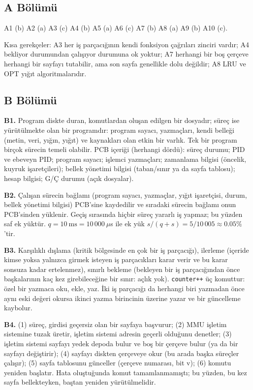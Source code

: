\documentclass[11pt,a4paper]{article}
\begin{document}
\subsection*{A Bölümü}
A1 (b) \quad A2 (a) \quad A3 (c) \quad A4 (b) \quad A5 (a) \quad A6 (c) \quad A7 (b) \quad A8 (a) \quad A9 (b) \quad A10 (c).

Kısa gerekçeler: A3 her iş parçacığının kendi fonksiyon çağrıları zinciri vardır; A4 bekliyor durumundan çalışıyor durumuna ok yoktur; A7 herhangi bir boş çerçeve herhangi bir sayfayı tutabilir, ama son sayfa genellikle dolu değildir; A8 LRU ve OPT yığıt algoritmalarıdır.

\subsection*{B Bölümü}
\textbf{B1.} Program diskte duran, komutlardan oluşan edilgen bir dosyadır; süreç ise yürütülmekte olan bir programdır: program sayacı, yazmaçları, kendi belleği (metin, veri, yığın, yığıt) ve kaynakları olan etkin bir varlık. Tek bir program birçok sürecin temeli olabilir. PCB içeriği (herhangi dördü): süreç durumu; PID ve ebeveyn PID; program sayacı; işlemci yazmaçları; zamanlama bilgisi (öncelik, kuyruk işaretçileri); bellek yönetimi bilgisi (taban/sınır ya da sayfa tablosu); hesap bilgisi; G/Ç durumu (açık dosyalar).

\textbf{B2.} Çalışan sürecin bağlamı (program sayacı, yazmaçlar, yığıt işaretçisi, durum, bellek yönetimi bilgisi) PCB'sine kaydedilir ve sıradaki sürecin bağlamı onun PCB'sinden yüklenir. Geçiş sırasında hiçbir süreç yararlı iş yapmaz; bu yüzden saf ek yüktür. $q = 10\ \text{ms} = 10\,000\ \mu$s ile ek yük $s/(q+s) = 5/10\,005 \approx 0.05\%$'tir.

\textbf{B3.} Karşılıklı dışlama (kritik bölgesinde en çok bir iş parçacığı), ilerleme (içeride kimse yoksa yalnızca girmek isteyen iş parçacıkları karar verir ve bu karar sonsuza kadar ertelenmez), sınırlı bekleme (bekleyen bir iş parçacığından önce başkalarının kaç kez girebileceğine bir sınır: açlık yok). \texttt{counter++} üç komuttur: özel bir yazmaca oku, ekle, yaz. İki iş parçacığı da herhangi biri yazmadan önce aynı eski değeri okursa ikinci yazma birincinin üzerine yazar ve bir güncelleme kaybolur.

\textbf{B4.} (1) süreç, girdisi geçersiz olan bir sayfaya başvurur; (2) MMU işletim sistemine tuzak üretir, işletim sistemi adresin geçerli olduğunu denetler; (3) işletim sistemi sayfayı yedek depoda bulur ve boş bir çerçeve bulur (ya da bir sayfayı değiştirir); (4) sayfayı diskten çerçeveye okur (bu arada başka süreçler çalışır); (5) sayfa tablosunu günceller (çerçeve numarası, bit v); (6) komutu yeniden başlatır. Hata oluştuğunda komut tamamlanmamıştı; bu yüzden, bu kez sayfa bellekteyken, baştan yeniden yürütülmelidir.
\end{document}
